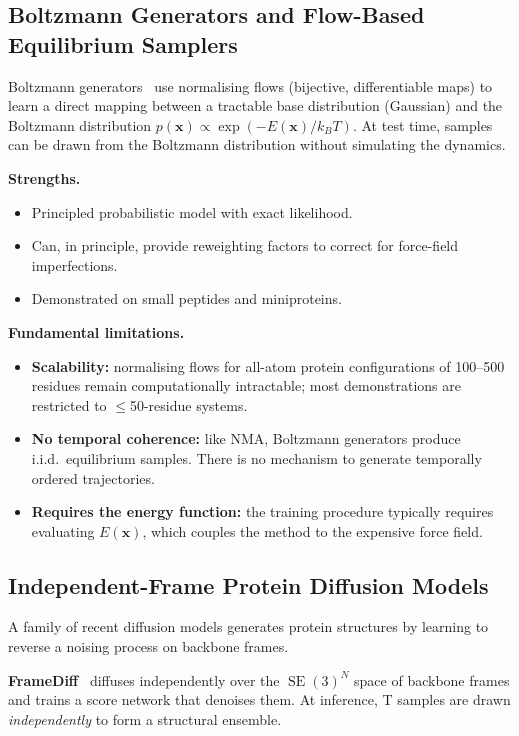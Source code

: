 \documentclass[11pt,a4paper]{article}
\DeclareMathOperator{\SE}{SE}
\newcommand{\bx}{\mathbf{x}}
\begin{document}
\subsection{Boltzmann Generators and Flow-Based Equilibrium Samplers}

Boltzmann generators~\cite{noe2019} use normalising flows (bijective, differentiable maps) to
learn a direct mapping between a tractable base distribution (Gaussian) and the Boltzmann
distribution $p(\bx) \propto \exp(-E(\bx)/k_BT)$.  At test time, samples can be drawn from the
Boltzmann distribution without simulating the dynamics.

\textbf{Strengths.}
\begin{itemize}[leftmargin=2em]
  \item Principled probabilistic model with exact likelihood.
  \item Can, in principle, provide reweighting factors to correct for force-field imperfections.
  \item Demonstrated on small peptides and miniproteins.
\end{itemize}

\textbf{Fundamental limitations.}
\begin{itemize}[leftmargin=2em]
  \item \textbf{Scalability:} normalising flows for all-atom protein configurations of 100--500
    residues remain computationally intractable; most demonstrations are restricted to
    $\leq$50-residue systems.
  \item \textbf{No temporal coherence:} like NMA, Boltzmann generators produce i.i.d.\ equilibrium
    samples.  There is no mechanism to generate temporally ordered trajectories.
  \item \textbf{Requires the energy function:} the training procedure typically requires
    evaluating $E(\bx)$, which couples the method to the expensive force field.
\end{itemize}

\subsection{Independent-Frame Protein Diffusion Models}

A family of recent diffusion models generates protein structures by learning to reverse a noising
process on backbone frames.

\textbf{FrameDiff}~\cite{yim2023framediff} diffuses independently over the $\SE(3)^N$ space of
backbone frames and trains a score network that denoises them.  At inference, T samples are
drawn \emph{independently} to form a structural ensemble.
\end{document}
